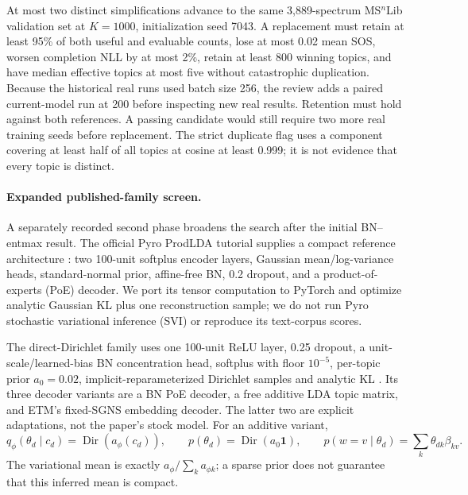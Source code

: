 \documentclass[10pt,a4paper]{article}
\begin{document}
At most two distinct simplifications advance to the same 3,889-spectrum
MS$^{n}$Lib validation set at $K=1000$, initialization seed 7043. A replacement
must retain at least 95\% of both useful and evaluable counts, lose at most
0.02 mean SOS, worsen completion NLL by at most 2\%, retain at least 800
winning topics, and have median effective topics at most five without
catastrophic duplication. Because the historical real runs used batch size
256, the review adds a paired current-model run at 200 before inspecting new
real results. Retention must hold against both references. A passing candidate
would still require two more real training seeds before replacement. The
strict duplicate flag uses a component covering at least half of all topics
at cosine at least 0.999; it is not evidence that every topic is distinct.

\paragraph{Expanded published-family screen.}
A separately recorded second phase broadens the search after the initial
BN--entmax result. The official Pyro ProdLDA tutorial supplies a compact
reference architecture \cite{pyroprodlda}: two 100-unit softplus encoder layers,
Gaussian mean/log-variance heads, standard-normal prior, affine-free BN, 0.2
dropout, and a product-of-experts (PoE) decoder. We port its tensor computation
to PyTorch and optimize analytic Gaussian KL plus one reconstruction sample;
we do not run Pyro stochastic variational inference (SVI) or reproduce its
text-corpus scores.

The direct-Dirichlet family uses one 100-unit ReLU layer, 0.25 dropout, a
unit-scale/learned-bias BN concentration head, softplus with floor $10^{-5}$,
per-topic prior $a_0=0.02$, implicit-reparameterized Dirichlet samples and
analytic KL \cite{burkhardt2019}. Its three decoder variants are a BN PoE
decoder, a free additive LDA topic matrix, and ETM's fixed-SGNS embedding
decoder. The latter two are explicit adaptations, not the paper's stock model.
For an additive variant,
\begin{equation}
 q_\phi(\theta_d\mid c_d)=\operatorname{Dir}(a_\phi(c_d)),\qquad
 p(\theta_d)=\operatorname{Dir}(a_0\mathbf{1}),\qquad
 p(w=v\mid\theta_d)=\sum_k\theta_{dk}\beta_{kv}.
\end{equation}
The variational mean is exactly $a_\phi/\sum_k a_{\phi k}$; a sparse prior
does not guarantee that this inferred mean is compact.
\end{document}

